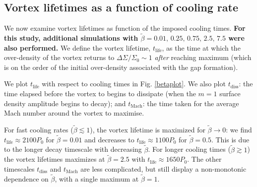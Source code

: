 

\subsection{Vortex lifetimes as a function of cooling
  rate}\label{lifetime_discuss} 

We now examine vortex lifetimes as function of the imposed cooling
times. {\bf For this study, additional simulations with 
  $\tilde\beta=0.01,\,0.25,\,0.75,\,2.5,\,7.5$ were also performed.} 
We define the vortex lifetime, $t_{\mathrm{life}}$, as the time
at which the over-density of the vortex
returns to $\Delta \Sigma/\Sigma_0\sim1$ \emph{after} reaching maximum
 (which is on the order of the
initial over-density associated with the gap formation). 

We plot $t_{\mathrm{life}}$ with respect to cooling times in
Fig. \ref{betaplot}. We also plot $t_{\mathrm{diss}}$: the time elapsed before the
vortex to begins to dissipate (when the $m=1$ surface density
amplitude begins to decay); and $t_{\mathrm{Mach}}$: the time taken
for the average Mach number around the vortex to maximise. 

For fast cooling rates ($\tilde{\beta}\lesssim 1$), the
vortex lifetime is maximized for $\tilde{\beta}\to0$: we find 
$t_{\mathrm{life}} \approx 2100P_0$ for $\tilde{\beta}=0.01$ and 
decreases to $t_{\mathrm{life}} \approx 1100P_0$ for
$\tilde{\beta}=0.5$. This is due to the longer decay timescale with
decreasing $\tilde{\beta}$. For longer cooling times ($\tilde{\beta}\gtrsim
1$) the vortex lifetimes maximizes at $\tilde\beta=2.5$ with 
$t_{\mathrm{life}}\approx 1650P_0$.  The other timescales $t_\mathrm{diss}$ and
$t_\mathrm{Mach}$ are less complicated, but still display a
non-monotonic dependence on $\tilde{\beta}$, with a single maximum at
$\tilde{\beta}=1$. 


